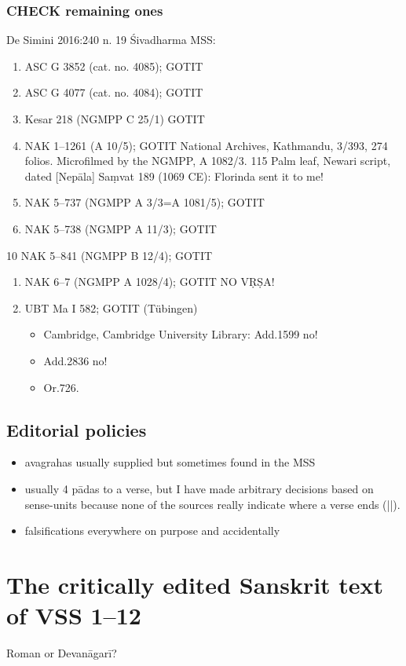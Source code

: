 \documentclass[11pt]{article}
\begin{document}
\subsubsection{CHECK remaining ones}
\label{sec:orgea9f34f}
De Simini 2016:240 n. 19 Śivadharma MSS:
\begin{enumerate}
\item ASC G 3852 (cat. no. 4085); GOTIT
\item ASC G 4077 (cat. no. 4084); GOTIT
\item Kesar 218 (NGMPP C 25/1) GOTIT
\item NAK 1--1261 (A 10/5); GOTIT
National Archives, Kathmandu, 3/393, 274 folios. Microfilmed by the NGMPP, A 1082/3. 
115 Palm leaf, Newari script, dated [Nepāla] Saṃvat 189 (1069 CE): Florinda sent it to me!
\item NAK 5--737 (NGMPP A 3/3=A 1081/5); GOTIT
\item NAK 5--738 (NGMPP A 11/3); GOTIT
\end{enumerate}
10  NAK 5--841 (NGMPP B 12/4); GOTIT 
\begin{enumerate}
\item NAK 6--7 (NGMPP A 1028/4);  GOTIT NO VṚṢA!
\item UBT Ma I 582; GOTIT (Tübingen)
\begin{itemize}
\item Cambridge, Cambridge University Library: Add.1599 no!
\item Add.2836 no!
\item Or.726.
\end{itemize}
\end{enumerate}

\subsection{Editorial policies}
\label{sec:orge8737ee}
\begin{itemize}
\item avagrahas usually supplied but sometimes found in the MSS
\item usually 4 pādas to a verse, but I have made arbitrary decisions based on sense-units 
because none of the sources really indicate where a verse ends (||).
\item falsifications everywhere on purpose and accidentally
\end{itemize}
\section{The critically edited Sanskrit text of VSS 1--12}
\label{sec:orgd12d76b}
Roman or Devanāgarī?
\end{document}
